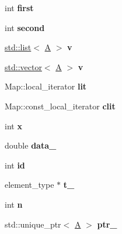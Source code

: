\begin{DoxyCompactItemize}
int {\bfseries first}
\item 
\mbox{\label{struct_a_ab3f9cf6e787671269dfe1f6088ee6214}} 
int {\bfseries second}
\item 
\mbox{\label{struct_a_adbc8e2f770638df36bdd8552554390bb}} 
\mbox{\hyperlink{classstd_1_1list}{std\+::list}}$<$ \mbox{\hyperlink{struct_a}{A}} $>$ {\bfseries v}
\item 
\mbox{\label{struct_a_a8f3b30204d54c05fb3f5b830af4ad150}} 
\mbox{\hyperlink{classstd_1_1vector}{std\+::vector}}$<$ \mbox{\hyperlink{struct_a}{A}} $>$ {\bfseries v}
\item 
\mbox{\label{struct_a_a3ed5765897d0aebe0e12456b2948f0eb}} 
Map\+::local\+\_\+iterator {\bfseries lit}
\item 
\mbox{\label{struct_a_a27a94245387980ed62aee679b56c7de7}} 
Map\+::const\+\_\+local\+\_\+iterator {\bfseries clit}
\item 
\mbox{\label{struct_a_af84f779019906949a0878ae29ebf2460}} 
int {\bfseries x}
\item 
\mbox{\label{struct_a_a62477a9d0e2f762330a9d494666e5a81}} 
double {\bfseries data\+\_\+}
\item 
\mbox{\label{struct_a_a7edcc35833879f73c0f36eeb06526452}} 
int {\bfseries id}
\item 
\mbox{\label{struct_a_a50a5e25d28ed06de43cfa784152e788f}} 
element\+\_\+type $\ast$ {\bfseries t\+\_\+}
\item 
\mbox{\label{struct_a_a0c14abd2e79acaffe5ea3a62b46ef447}} 
int {\bfseries n}
\item 
\mbox{\label{struct_a_a922892dd4081f1c947620776cadb0f20}} 
std\+::unique\+\_\+ptr$<$ \mbox{\hyperlink{struct_a}{A}} $>$ {\bfseries ptr\+\_\+}
\end{DoxyCompactItemize}
